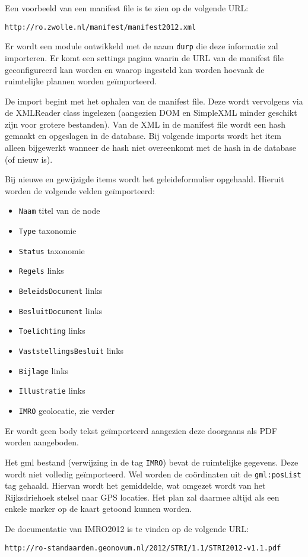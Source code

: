 Een voorbeeld van een manifest file is te zien op de volgende URL:
\begin{verbatim}
http://ro.zwolle.nl/manifest/manifest2012.xml
\end{verbatim}

Er wordt een module ontwikkeld met de naam \texttt{durp} die deze informatie zal importeren. Er komt een settings pagina waarin de URL van de manifest file geconfigureerd kan worden en waarop ingesteld kan worden hoevaak de ruimtelijke plannen worden ge\"{i}mporteerd.

De import begint met het ophalen van de manifest file. Deze wordt vervolgens via de XMLReader class ingelezen (aangezien DOM en SimpleXML minder geschikt zijn voor grotere bestanden). Van de XML in de manifest file wordt een hash gemaakt en opgeslagen in de database. Bij volgende imports wordt het item alleen bijgewerkt wanneer de hash niet overeenkomt met de hash in de database (of nieuw is).

Bij nieuwe en gewijzigde items wordt het geleideformulier opgehaald. Hieruit worden de volgende velden ge\"{i}mporteerd:
\begin{itemize}
\item \texttt{Naam} titel van de node
\item \texttt{Type} taxonomie
\item \texttt{Status} taxonomie
\item \texttt{Regels} links
\item \texttt{BeleidsDocument} links
\item \texttt{BesluitDocument} links
\item \texttt{Toelichting} links
\item \texttt{VaststellingsBesluit} links
\item \texttt{Bijlage} links
\item \texttt{Illustratie} links
\item \texttt{IMRO} geolocatie, zie verder
\end{itemize}
Er wordt geen body tekst ge\"{i}mporteerd aangezien deze doorgaans als PDF worden aangeboden.

Het gml bestand (verwijzing in de tag \texttt{IMRO}) bevat de ruimtelijke gegevens. Deze wordt niet volledig ge\"{i}mporteerd. Wel worden de co\"{o}rdinaten uit de \texttt{gml:posList} tag gehaald. Hiervan wordt het gemiddelde, wat omgezet wordt van het Rijksdriehoek stelsel naar GPS locaties. Het plan zal daarmee altijd als een enkele marker op de kaart getoond kunnen worden.

De documentatie van IMRO2012 is te vinden op de volgende URL:
\begin{verbatim}
http://ro-standaarden.geonovum.nl/2012/STRI/1.1/STRI2012-v1.1.pdf
\end{verbatim}





